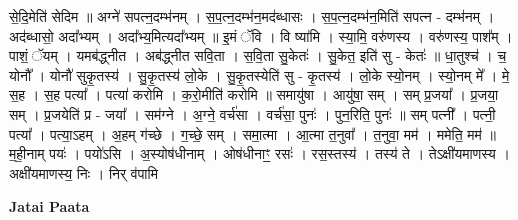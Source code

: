 \documentclass[17pt]{extarticle}
\begin{document}
से॒दि॒मेति॑ सेदिम ॥ अग्ने॑ सपत्न॒दम्भ॑नम् । स॒प॒त्न॒दम्भ॑न॒मद॑ब्धासः । स॒प॒त्न॒दम्भ॑न॒मिति॑ सपत्न - दम्भ॑नम् । अद॑ब्धासो॒ अदा᳚भ्यम् । अदा᳚भ्य॒मित्यदा᳚भ्यम् ॥ इ॒मं ॅवि । वि ष्या॑मि । स्या॒मि॒ वरु॑णस्य । वरु॑णस्य॒ पाश᳚म् । पाशं॒ ॅयम् । यमब॑द्ध्नीत । अब॑द्ध्नीत सवि॒ता । स॒वि॒ता सु॒केतः॑ । सु॒केत॒ इति॑ सु - केतः॑ ॥ धा॒तुश्च॑ । च॒ योनौ᳚ । योनौ॑ सुकृ॒तस्य॑ । सु॒कृ॒तस्य॑ लो॒के । सु॒कृ॒तस्येति॑ सु - कृ॒तस्य॑ । लो॒के स्यो॒नम् । स्यो॒नम् मे᳚ । मे॒ स॒ह । स॒ह पत्या᳚ । पत्या॑ करोमि । क॒रो॒मीति॑ करोमि ॥ समायु॑षा । आयु॑षा॒ सम् । सम् प्र॒जया᳚ । प्र॒जया॒ सम् । प्र॒जयेति॑ प्र - जया᳚ । सम॑ग्ने । अ॒ग्ने॒ वर्च॑सा । वर्च॑सा॒ पुनः॑ । पुन॒रिति॒ पुनः॑ ॥ सम् पत्नी᳚ । पत्नी॒ पत्या᳚ । पत्या॒ऽहम् । अ॒हम् ग॑च्छे । ग॒च्छे॒ सम् । समा॒त्मा । आ॒त्मा त॒नुवा᳚ । त॒नुवा॒ मम॑ । ममेति॒ मम॑ ॥ म॒ही॒नाम् पयः॑ । पयो॑ऽसि । अ॒स्योष॑धीनाम् । ओष॑धीनाꣳ॒॒ रसः॑ । रस॒स्तस्य॑ । तस्य॑ ते । तेऽक्षी॑यमाणस्य । अक्षी॑यमाणस्य॒ निः । निर् व॑पामि \newline

\textbf{Jatai Paata} \newline
\end{document}

